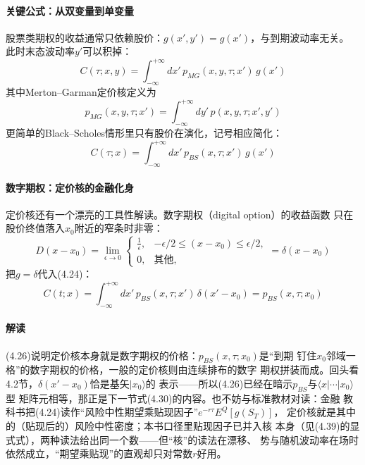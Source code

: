 \paragraph{关键公式：从双变量到单变量}
股票类期权的收益通常只依赖股价：$g(x',y')=g(x')$，与到期波动率无关。
此时末态波动率$y'$可以积掉：
\begin{equation*}
C(\tau;x,y)=\int_{-\infty}^{+\infty}dx'\,
p_{MG}(x,y,\tau;x')\,g(x')
\tag{4.22}
\end{equation*}
其中Merton--Garman定价核定义为
\begin{equation*}
p_{MG}(x,y,\tau;x')=\int_{-\infty}^{+\infty}dy'\,
p(x,y,\tau;x',y')
\tag{4.23}
\end{equation*}
更简单的Black--Scholes情形里只有股价在演化，记号相应简化：
\begin{equation*}
C(\tau;x)=\int_{-\infty}^{+\infty}dx'\,
p_{BS}(x,\tau;x')\,g(x')
\tag{4.24}
\end{equation*}

\paragraph{数字期权：定价核的金融化身}
定价核还有一个漂亮的工具性解读。数字期权（digital option）的收益函数
只在股价终值落入$x_0$附近的窄条时非零：
\begin{equation*}
D(x-x_{0})=\lim_{\epsilon\to0}
\begin{cases}
\frac{1}{\epsilon}, & -\epsilon/2\leq(x-x_{0})\leq\epsilon/2,\\
0, & \text{其他},
\end{cases}
=\delta(x-x_{0})
\end{equation*}
把$g=\delta$代入(4.24)：
\begin{equation*}
C(t;x)=\int_{-\infty}^{+\infty}dx'\,
p_{BS}(x,\tau;x')\,\delta(x'-x_{0})
=p_{BS}(x,\tau;x_{0})
\tag{4.26}
\end{equation*}

\paragraph{解读}
(4.26)说明定价核本身就是数字期权的价格：$p_{BS}(x,\tau;x_{0})$是“到期
钉住$x_{0}$邻域一格”的数字期权的价格，一般的定价核则由连续排布的数字
期权拼装而成。回头看4.2节，$\delta(x'-x_{0})$恰是基矢$|x_{0}\rangle$的
表示——所以(4.26)已经在暗示$p_{BS}$与$\langle x|\cdots|x_{0}\rangle$型
矩阵元相等，那正是下一节式(4.30)的内容。也不妨与标准教材对读：金融
教科书把(4.24)读作“风险中性期望乘贴现因子”$e^{-r\tau}E^{Q}[g(S_{T})]$，
定价核就是其中的（贴现后的）风险中性密度；本书口径里贴现因子已并入核
本身（见(4.39)的显式式），两种读法给出同一个数——但“核”的读法在漂移、
势与随机波动率在场时依然成立，“期望乘贴现”的直观却只对常数$r$好用。

